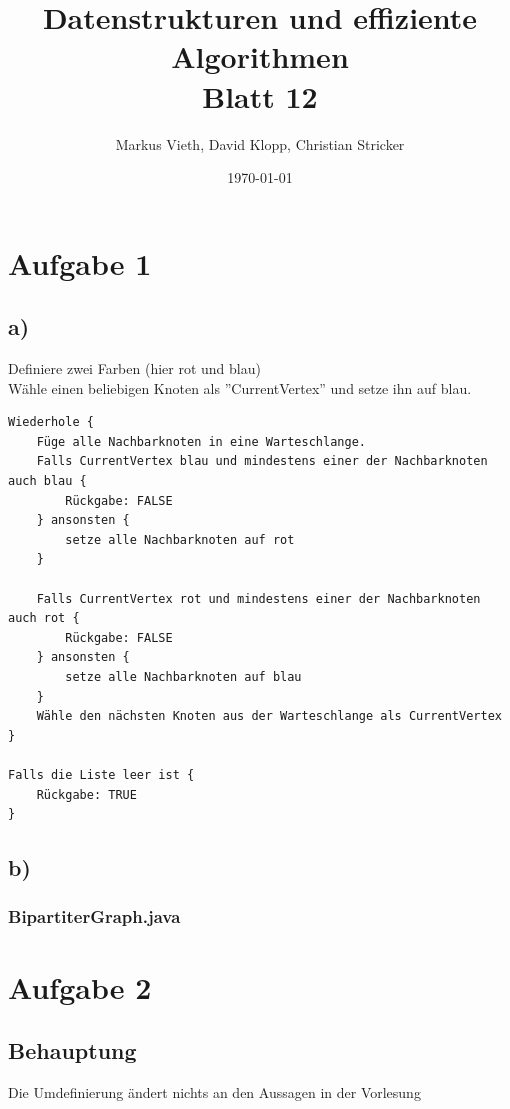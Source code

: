 \documentclass[a4paper,11pt,twoside]{scrartcl}
\title{Datenstrukturen und effiziente Algorithmen\\ Blatt 12}
\author{Markus Vieth, David Klopp, Christian Stricker}
\date{\today}
\begin{document}
\maketitle
\cleardoublepage
\pagestyle{myheadings}

\section*{Aufgabe 1}
\subsection*{a)} 
Definiere zwei Farben (hier rot und blau)\\
Wähle einen beliebigen Knoten als ''CurrentVertex'' und setze ihn auf blau.\\

\begin{lstlisting}[basicstyle=\scriptsize\ttfamily]
Wiederhole {
	Füge alle Nachbarknoten in eine Warteschlange.
	Falls CurrentVertex blau und mindestens einer der Nachbarknoten auch blau {
		Rückgabe: FALSE
	} ansonsten {
		setze alle Nachbarknoten auf rot
	}
	
	Falls CurrentVertex rot und mindestens einer der Nachbarknoten auch rot {
		Rückgabe: FALSE
	} ansonsten {
		setze alle Nachbarknoten auf blau
	}
	Wähle den nächsten Knoten aus der Warteschlange als CurrentVertex
}

Falls die Liste leer ist {
	Rückgabe: TRUE
}
\end{lstlisting}

\subsection*{b)}
\subsubsection*{\footnotesize BipartiterGraph.java}




\section*{Aufgabe 2}
\subsection*{Behauptung}
Die Umdefinierung ändert nichts an den Aussagen in der Vorlesung
\end{document}
